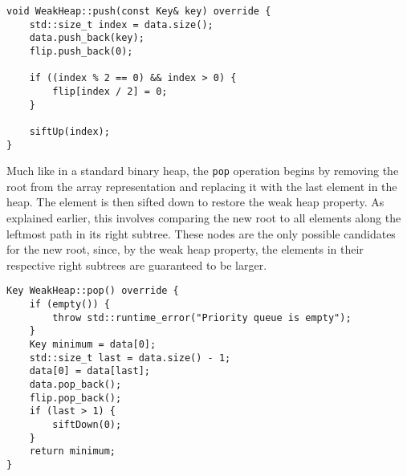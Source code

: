 \begin{verbatim}
void WeakHeap::push(const Key& key) override {
    std::size_t index = data.size();
    data.push_back(key);
    flip.push_back(0);

    if ((index % 2 == 0) && index > 0) {
        flip[index / 2] = 0;
    }

    siftUp(index);
}
\end{verbatim}

Much like in a standard binary heap, the \texttt{pop} operation begins by removing the root from the array representation and replacing it with the last element in the heap. The element is then sifted down to restore the weak heap property. As explained earlier, this involves comparing the new root to all elements along the leftmost path in its right subtree. These nodes are the only possible candidates for the new root, since, by the weak heap property, the elements in their respective right subtrees are guaranteed to be larger.

\begin{verbatim}
Key WeakHeap::pop() override {
    if (empty()) {
        throw std::runtime_error("Priority queue is empty");
    }
    Key minimum = data[0];
    std::size_t last = data.size() - 1;
    data[0] = data[last];
    data.pop_back();
    flip.pop_back();
    if (last > 1) {
        siftDown(0);
    }
    return minimum;
}
\end{verbatim}
